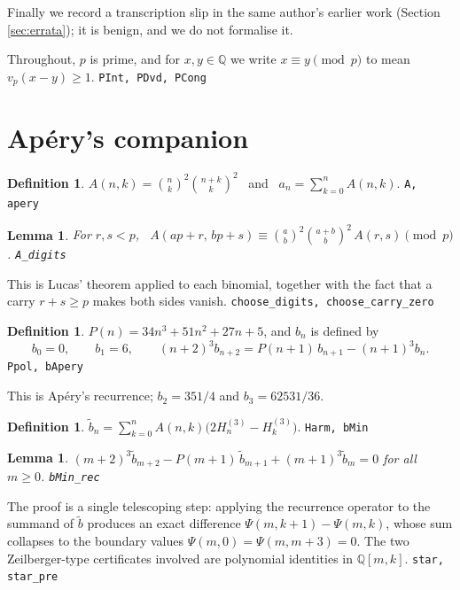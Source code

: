 \documentclass[11pt,a4paper]{amsart}
\theoremstyle{plain}
\newtheorem{lemma}[theorem]{Lemma}
\theoremstyle{definition}
\newtheorem{definition}[theorem]{Definition}
\theoremstyle{remark}
\newcommand{\lean}[1]{\hfill\texttt{\footnotesize #1}}
\newcommand{\QQ}{\mathbb{Q}}
\newcommand{\vp}{v_p}
\begin{document}
Finally we record a transcription slip in the same author's earlier work
(Section \ref{sec:errata}); it is benign, and we do not formalise it.

Throughout, $p$ is prime, and for $x,y\in\QQ$ we write $x\equiv y\pmod p$ to mean
$\vp(x-y)\ge1$.
\lean{PInt, PDvd, PCong}

\section{Ap\'ery's companion}

\begin{definition}
$\displaystyle A(n,k)=\binom nk^2\binom{n+k}k^2$ \ and \ $a_n=\sum_{k=0}^n A(n,k)$.
\lean{A, apery}
\end{definition}

\begin{lemma}\label{lem:Adigits}
For $r,s<p$, \ $A(ap+r,\,bp+s)\equiv\binom ab^2\binom{a+b}b^2\,A(r,s)\pmod p$.
\lean{A\_digits}
\end{lemma}

This is Lucas' theorem applied to each binomial, together with the fact that a carry
$r+s\ge p$ makes both sides vanish.
\lean{choose\_digits, choose\_carry\_zero}

\begin{definition}\label{def:bApery}
$P(n)=34n^3+51n^2+27n+5$, and $b_n$ is defined by
\[
  b_0=0,\qquad b_1=6,\qquad (n+2)^3b_{n+2}=P(n+1)\,b_{n+1}-(n+1)^3b_n .
\]
\lean{Ppol, bApery}
\end{definition}

This is Ap\'ery's recurrence; $b_2=351/4$ and $b_3=62531/36$.

\begin{definition}
$\displaystyle \tilde b_n=\sum_{k=0}^n A(n,k)\bigl(2H^{(3)}_n-H^{(3)}_k\bigr)$.
\lean{Harm, bMin}
\end{definition}

\begin{lemma}\label{lem:rec}
$(m+2)^3\tilde b_{m+2}-P(m+1)\,\tilde b_{m+1}+(m+1)^3\tilde b_m=0$ for all $m\ge0$.
\lean{bMin\_rec}
\end{lemma}

The proof is a single telescoping step: applying the recurrence operator to the summand
of $\tilde b$ produces an exact difference $\Psi(m,k+1)-\Psi(m,k)$, whose sum collapses to
the boundary values $\Psi(m,0)=\Psi(m,m+3)=0$. The two Zeilberger-type certificates
involved are polynomial identities in $\QQ[m,k]$.
\lean{star, star\_pre}
\end{document}
